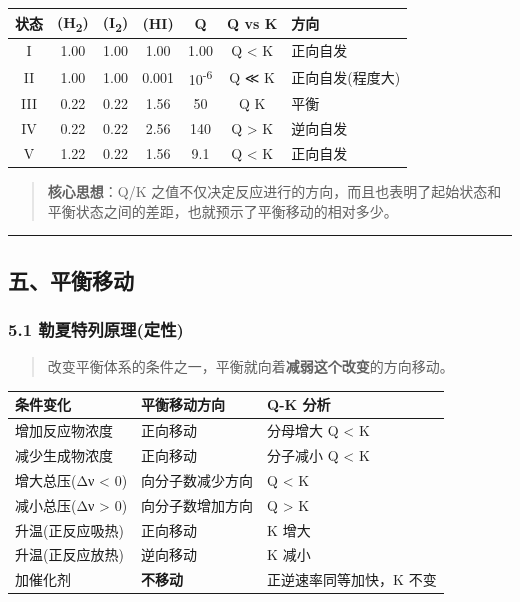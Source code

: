 {\def\LTcaptype{none} %
\begin{longtable}[]{@{}ccccccl@{}}
\toprule\noalign{}
状态 & (H\textsubscript{2}) & (I\textsubscript{2}) & (HI) & Q & Q vs K & 方向 \\
\midrule\noalign{}
\endhead
\bottomrule\noalign{}
\endlastfoot
I & 1.00 & 1.00 & 1.00 & 1.00 & Q \textless{} K & 正向自发 \\
II & 1.00 & 1.00 & 0.001 & 10\textsuperscript{-6} & Q ≪ K & 正向自发(程度大) \\
III & 0.22 & 0.22 & 1.56 & 50 & Q  K & 平衡 \\
IV & 0.22 & 0.22 & 2.56 & 140 & Q \textgreater{} K & 逆向自发 \\
V & 1.22 & 0.22 & 1.56 & 9.1 & Q \textless{} K & 正向自发 \\
\end{longtable}
}

\begin{quote}
\textbf{核心思想}：Q/K 之值不仅决定反应进行的方向，而且也表明了起始状态和平衡状态之间的差距，也就预示了平衡移动的相对多少。
\end{quote}

\begin{center}\rule{0.5\linewidth}{0.5pt}\end{center}

\subsection{五、平衡移动}\label{ux4e94ux5e73ux8861ux79fbux52a8}

\subsubsection{5.1 勒夏特列原理(定性)}\label{ux52d2ux590fux7279ux5217ux539fux7406ux5b9aux6027}

\begin{quote}
改变平衡体系的条件之一，平衡就向着\textbf{减弱这个改变}的方向移动。
\end{quote}

{\def\LTcaptype{none} %
\begin{longtable}[]{@{}lll@{}}
\toprule\noalign{}
条件变化 & 平衡移动方向 & Q-K 分析 \\
\midrule\noalign{}
\endhead
\bottomrule\noalign{}
\endlastfoot
增加反应物浓度 & 正向移动 & 分母增大 \箭 Q \textless{} K \\
减少生成物浓度 & 正向移动 & 分子减小 \箭 Q \textless{} K \\
增大总压(Δν \textless{} 0) & 向分子数减少方向 & Q \textless{} K \\
减小总压(Δν \textgreater{} 0) & 向分子数增加方向 & Q \textgreater{} K \\
升温(正反应吸热) & 正向移动 & K 增大 \\
升温(正反应放热) & 逆向移动 & K 减小 \\
加催化剂 & \textbf{不移动} & 正逆速率同等加快，K 不变 \\
\end{longtable}
}

